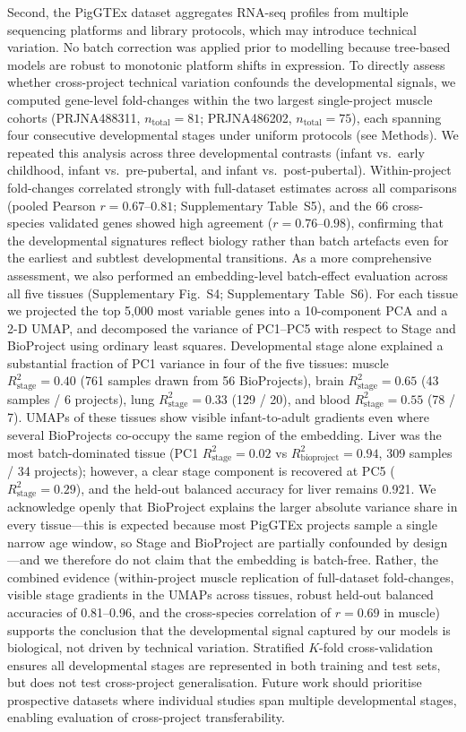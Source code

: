 \documentclass[10pt,a4paper]{article}
\begin{document}
Second, the PigGTEx dataset aggregates RNA-seq profiles from multiple sequencing platforms and library protocols, which may introduce technical variation. No batch correction was applied prior to modelling because tree-based models are robust to monotonic platform shifts in expression. To directly assess whether cross-project technical variation confounds the developmental signals, we computed gene-level fold-changes within the two largest single-project muscle cohorts (PRJNA488311, $n_{\text{total}} = 81$; PRJNA486202, $n_{\text{total}} = 75$), each spanning four consecutive developmental stages under uniform protocols (see Methods). We repeated this analysis across three developmental contrasts (infant vs.\ early childhood, infant vs.\ pre-pubertal, and infant vs.\ post-pubertal). Within-project fold-changes correlated strongly with full-dataset estimates across all comparisons (pooled Pearson $r = 0.67$--$0.81$; Supplementary Table~S5), and the 66 cross-species validated genes showed high agreement ($r = 0.76$--$0.98$), confirming that the developmental signatures reflect biology rather than batch artefacts even for the earliest and subtlest developmental transitions. As a more comprehensive assessment, we also performed an embedding-level batch-effect evaluation across all five tissues (Supplementary Fig.~S4; Supplementary Table~S6). For each tissue we projected the top 5,000 most variable genes into a 10-component PCA and a 2-D UMAP, and decomposed the variance of PC1--PC5 with respect to Stage and BioProject using ordinary least squares. Developmental stage alone explained a substantial fraction of PC1 variance in four of the five tissues: muscle $R^2_{\text{stage}} = 0.40$ (761 samples drawn from 56 BioProjects), brain $R^2_{\text{stage}} = 0.65$ (43 samples / 6 projects), lung $R^2_{\text{stage}} = 0.33$ (129 / 20), and blood $R^2_{\text{stage}} = 0.55$ (78 / 7). UMAPs of these tissues show visible infant-to-adult gradients even where several BioProjects co-occupy the same region of the embedding. Liver was the most batch-dominated tissue (PC1 $R^2_{\text{stage}} = 0.02$ vs $R^2_{\text{bioproject}} = 0.94$, 309 samples / 34 projects); however, a clear stage component is recovered at PC5 ($R^2_{\text{stage}} = 0.29$), and the held-out balanced accuracy for liver remains 0.921. We acknowledge openly that BioProject explains the larger absolute variance share in every tissue---this is expected because most PigGTEx projects sample a single narrow age window, so Stage and BioProject are partially confounded by design---and we therefore do not claim that the embedding is batch-free. Rather, the combined evidence (within-project muscle replication of full-dataset fold-changes, visible stage gradients in the UMAPs across tissues, robust held-out balanced accuracies of 0.81--0.96, and the cross-species correlation of $r=0.69$ in muscle) supports the conclusion that the developmental signal captured by our models is biological, not driven by technical variation. Stratified $K$-fold cross-validation ensures all developmental stages are represented in both training and test sets, but does not test cross-project generalisation. Future work should prioritise prospective datasets where individual studies span multiple developmental stages, enabling evaluation of cross-project transferability.
\end{document}
